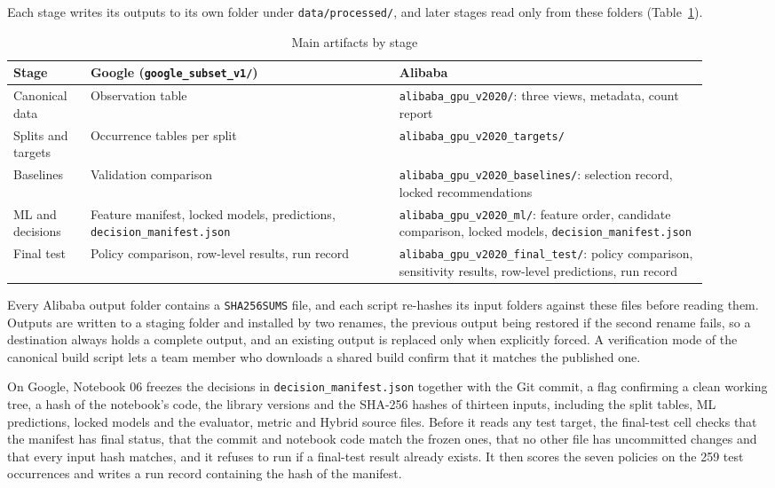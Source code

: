 Each stage writes its outputs to its own folder under \texttt{data/processed/}, and later stages read only from these folders (Table~\ref{tab:5.7}).

\begin{table}[!t]
\centering
\footnotesize
\caption{Main artifacts by stage}\label{tab:5.7}
\begin{tabular}{>{\raggedright\arraybackslash}p{0.107\linewidth}>{\raggedright\arraybackslash}p{0.402\linewidth}>{\raggedright\arraybackslash}p{0.402\linewidth}}
\hline
\textbf{Stage} & \textbf{Google (\texttt{google\_subset\_v1/})} & \textbf{Alibaba} \\ \hline
Canonical data & Observation table & \texttt{alibaba\_gpu\_v2020/}: three views, metadata, count report \\
Splits and targets & Occurrence tables per split & \texttt{alibaba\_gpu\_v2020\_targets/} \\
Baselines & Validation comparison & \texttt{alibaba\_gpu\_v2020\_baselines/}: selection record, locked recommendations \\
ML and decisions & Feature manifest, locked models, predictions, \texttt{decision\_manifest.json} & \texttt{alibaba\_gpu\_v2020\_ml/}: feature order, candidate comparison, locked models, \texttt{decision\_manifest.json} \\
Final test & Policy comparison, row-level results, run record & \texttt{alibaba\_gpu\_v2020\_final\_test/}: policy comparison, sensitivity results, row-level predictions, run record \\
\hline
\end{tabular}
\end{table}

Every Alibaba output folder contains a \texttt{SHA256SUMS} file, and each script re-hashes its input folders against these files before reading them. Outputs are written to a staging folder and installed by two renames, the previous output being restored if the second rename fails, so a destination always holds a complete output, and an existing output is replaced only when explicitly forced. A verification mode of the canonical build script lets a team member who downloads a shared build confirm that it matches the published one.

On Google, Notebook 06 freezes the decisions in \texttt{decision\_manifest.json} together with the Git commit, a flag confirming a clean working tree, a hash of the notebook's code, the library versions and the SHA-256 hashes of thirteen inputs, including the split tables, ML predictions, locked models and the evaluator, metric and Hybrid source files. Before it reads any test target, the final-test cell checks that the manifest has final status, that the commit and notebook code match the frozen ones, that no other file has uncommitted changes and that every input hash matches, and it refuses to run if a final-test result already exists. It then scores the seven policies on the 259 test occurrences and writes a run record containing the hash of the manifest.

